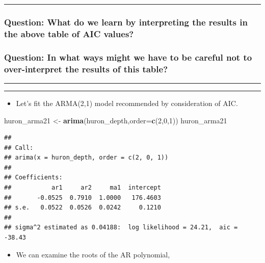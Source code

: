\documentclass[]{article}
\newenvironment{Shaded}{\begin{snugshade}}{\end{snugshade}}
\newcommand{\KeywordTok}[1]{\textcolor[rgb]{0.13,0.29,0.53}{\textbf{#1}}}
\newcommand{\DataTypeTok}[1]{\textcolor[rgb]{0.13,0.29,0.53}{#1}}
\newcommand{\DecValTok}[1]{\textcolor[rgb]{0.00,0.00,0.81}{#1}}
\newcommand{\StringTok}[1]{\textcolor[rgb]{0.31,0.60,0.02}{#1}}
\newcommand{\NormalTok}[1]{#1}
\providecommand{\tightlist}{%
  \setlength{\itemsep}{0pt}\setlength{\parskip}{0pt}}
\begin{document}
\begin{center}\rule{0.5\linewidth}{\linethickness}\end{center}

\subsubsection{Question: What do we learn by interpreting the results in
the above table of AIC
values?}\label{question-what-do-we-learn-by-interpreting-the-results-in-the-above-table-of-aic-values}

\subsubsection{Question: In what ways might we have to be careful not to
over-interpret the results of this
table?}\label{question-in-what-ways-might-we-have-to-be-careful-not-to-over-interpret-the-results-of-this-table}

\begin{center}\rule{0.5\linewidth}{\linethickness}\end{center}

\begin{center}\rule{0.5\linewidth}{\linethickness}\end{center}

\begin{itemize}
\tightlist
\item
  Let's fit the ARMA(2,1) model recommended by consideration of AIC.
\end{itemize}

\begin{Shaded}
\begin{Highlighting}[]
\NormalTok{huron_arma21 <-}\StringTok{ }\KeywordTok{arima}\NormalTok{(huron_depth,}\DataTypeTok{order=}\KeywordTok{c}\NormalTok{(}\DecValTok{2}\NormalTok{,}\DecValTok{0}\NormalTok{,}\DecValTok{1}\NormalTok{))}
\NormalTok{huron_arma21}
\end{Highlighting}
\end{Shaded}

\begin{verbatim}
## 
## Call:
## arima(x = huron_depth, order = c(2, 0, 1))
## 
## Coefficients:
##           ar1     ar2     ma1  intercept
##       -0.0525  0.7910  1.0000   176.4603
## s.e.   0.0522  0.0526  0.0242     0.1210
## 
## sigma^2 estimated as 0.04188:  log likelihood = 24.21,  aic = -38.43
\end{verbatim}

\begin{itemize}
\tightlist
\item
  We can examine the roots of the AR polynomial,
\end{itemize}
\end{document}
